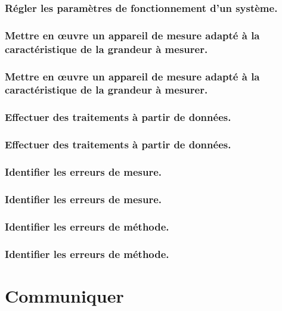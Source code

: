 \documentclass[10pt,fleqn]{book}
\begin{document}
\subsection{Régler les paramètres de fonctionnement d'un système.} 

\subsection{Mettre en œuvre un appareil de mesure adapté à la caractéristique de la grandeur à mesurer.} 

\subsection{Mettre en œuvre un appareil de mesure adapté à la caractéristique de la grandeur à mesurer.} 

\subsection{Effectuer des traitements à partir de données. } 

\subsection{Effectuer des traitements à partir de données. } 

\subsection{Identifier les erreurs de mesure.} 

\subsection{Identifier les erreurs de mesure.} 

\subsection{Identifier les erreurs de méthode.} 

\subsection{Identifier les erreurs de méthode.} 

\chapter{Communiquer} 
\end{document}
